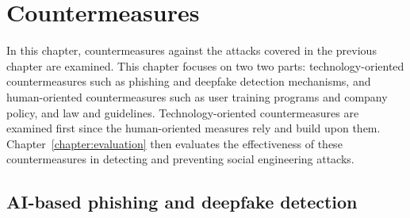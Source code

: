 


\chapter{Countermeasures\label{chapter:countermeasures}}

\begin{comment}

TODO:
    [ ] 

What to cover:
    - AI monitoring content and informing the user if something they are about to share could be used against them or their organization?
    - AI generated training content suited to the personality of the user
    - Policies and EU etc regulations about the development of AI tech

\end{comment}

In this chapter, countermeasures against the attacks covered in the previous chapter are examined. This chapter focuses on two two parts: technology-oriented countermeasures such as phishing and deepfake detection mechanisms, and human-oriented countermeasures such as user training programs and company policy, and law and guidelines. Technology-oriented countermeasures are examined first since the human-oriented measures rely and build upon them. Chapter~\ref{chapter:evaluation} then evaluates the effectiveness of these countermeasures in detecting and preventing social engineering attacks.












\section{AI-based phishing and deepfake detection}
\begin{comment}

AI-generated content detection

What to cover:
    - Deepfake content detection
    - Spear phishing detection
        - Also spear phishing that is written by humans (thus the title can't be AI-generated content detection?)

    
\end{comment}



